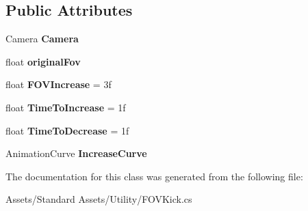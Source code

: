 \subsection*{Public Attributes}
\begin{DoxyCompactItemize}
\item 
Camera {\bfseries Camera}\hypertarget{class_unity_standard_assets_1_1_utility_1_1_f_o_v_kick_a3ae90ba267d5979aa59950ed4f76d78f}{}\label{class_unity_standard_assets_1_1_utility_1_1_f_o_v_kick_a3ae90ba267d5979aa59950ed4f76d78f}

\item 
float {\bfseries original\+Fov}\hypertarget{class_unity_standard_assets_1_1_utility_1_1_f_o_v_kick_a4969e492fb48a6d65f9d022b4b5b3b50}{}\label{class_unity_standard_assets_1_1_utility_1_1_f_o_v_kick_a4969e492fb48a6d65f9d022b4b5b3b50}

\item 
float {\bfseries F\+O\+V\+Increase} = 3f\hypertarget{class_unity_standard_assets_1_1_utility_1_1_f_o_v_kick_a000532bb540999d880107469e14b1d61}{}\label{class_unity_standard_assets_1_1_utility_1_1_f_o_v_kick_a000532bb540999d880107469e14b1d61}

\item 
float {\bfseries Time\+To\+Increase} = 1f\hypertarget{class_unity_standard_assets_1_1_utility_1_1_f_o_v_kick_abe3ae5ad6ab9e75ed866ed84b20aa1ba}{}\label{class_unity_standard_assets_1_1_utility_1_1_f_o_v_kick_abe3ae5ad6ab9e75ed866ed84b20aa1ba}

\item 
float {\bfseries Time\+To\+Decrease} = 1f\hypertarget{class_unity_standard_assets_1_1_utility_1_1_f_o_v_kick_a5624579aac52e515f99d244c73852e73}{}\label{class_unity_standard_assets_1_1_utility_1_1_f_o_v_kick_a5624579aac52e515f99d244c73852e73}

\item 
Animation\+Curve {\bfseries Increase\+Curve}\hypertarget{class_unity_standard_assets_1_1_utility_1_1_f_o_v_kick_a17f2bd98b1e8913e420b8032ff94c6cc}{}\label{class_unity_standard_assets_1_1_utility_1_1_f_o_v_kick_a17f2bd98b1e8913e420b8032ff94c6cc}

\end{DoxyCompactItemize}


The documentation for this class was generated from the following file\+:\begin{DoxyCompactItemize}
\item 
Assets/\+Standard Assets/\+Utility/F\+O\+V\+Kick.\+cs\end{DoxyCompactItemize}

